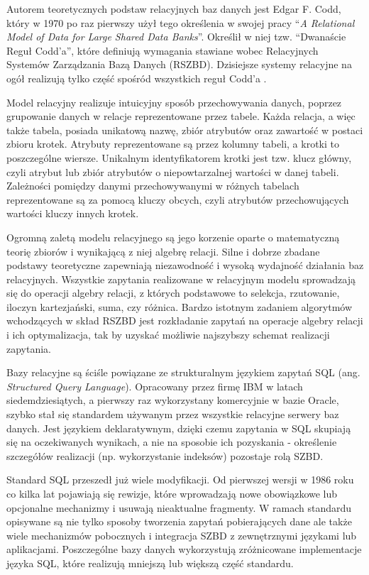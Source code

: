 \documentclass[a4paper,twoside,12pt]{book}
\begin{document}
Autorem teoretycznych podstaw relacyjnych baz danych jest Edgar F. Codd, który w 1970 po raz pierwszy użył tego określenia w swojej pracy ``\textit{A Relational Model of Data for Large Shared Data Banks}''. Określił w niej tzw. ``Dwanaście Reguł Codd'a'', które definiują wymagania stawiane wobec Relacyjnych Systemów Zarządzania Bazą Danych (RSZBD). Dzisiejsze systemy relacyjne na ogół realizują tylko część spośród wszystkich reguł Codd'a \cite{bib:codd-relational-model-of-data}.

Model relacyjny realizuje intuicyjny sposób przechowywania danych, poprzez grupowanie danych w relacje reprezentowane przez tabele. Każda relacja, a więc także tabela, posiada unikatową nazwę, zbiór atrybutów oraz zawartość w postaci zbioru krotek. Atrybuty reprezentowane są przez kolumny tabeli, a krotki to poszczególne wiersze. Unikalnym identyfikatorem krotki jest tzw. klucz główny, czyli atrybut lub zbiór atrybutów o niepowtarzalnej wartości w danej tabeli. Zależności pomiędzy danymi przechowywanymi w różnych tabelach reprezentowane są za pomocą kluczy obcych, czyli atrybutów przechowujących wartości kluczy innych krotek.

Ogromną zaletą modelu relacyjnego są jego korzenie oparte o matematyczną teorię zbiorów i wynikającą z niej algebrę relacji. Silne i dobrze zbadane podstawy teoretyczne zapewniają niezawodność i wysoką wydajność działania baz relacyjnych. Wszystkie zapytania realizowane w relacyjnym modelu sprowadzają się do operacji algebry relacji, z których podstawowe to selekcja, rzutowanie, iloczyn kartezjański, suma, czy różnica. Bardzo istotnym zadaniem algorytmów wchodzących w skład RSZBD jest rozkładanie zapytań na operacje algebry relacji i ich optymalizacja, tak by uzyskać możliwie najszybszy schemat realizacji zapytania.

Bazy relacyjne są ściśle powiązane ze strukturalnym językiem zapytań SQL (ang. \textit{Structured Query Language}). Opracowany przez firmę IBM w latach siedemdziesiątych, a pierwszy raz wykorzystany komercyjnie w bazie Oracle, szybko stał się standardem używanym przez wszystkie relacyjne serwery baz danych. Jest językiem deklaratywnym, dzięki czemu zapytania w SQL skupiają się na oczekiwanych wynikach, a nie na sposobie ich pozyskania - określenie szczegółów realizacji (np. wykorzystanie indeksów) pozostaje rolą SZBD. 

Standard SQL przeszedł już wiele modyfikacji. Od pierwszej wersji w 1986 roku co kilka lat pojawiają się rewizje, które wprowadzają nowe obowiązkowe lub opcjonalne mechanizmy i usuwają nieaktualne fragmenty. W ramach standardu opisywane są nie tylko sposoby tworzenia zapytań pobierających dane ale także wiele mechanizmów pobocznych i integracja SZBD z zewnętrznymi językami lub aplikacjami. Poszczególne bazy danych wykorzystują zróżnicowane implementacje języka SQL, które realizują mniejszą lub większą część standardu.
\end{document}
